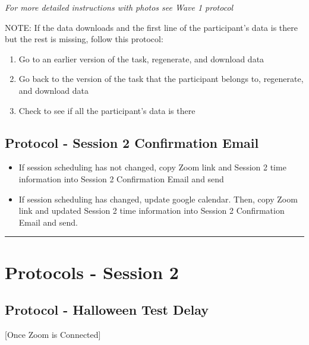 \documentclass[]{book}
\begin{document}
\emph{For more detailed instructions with photos see Wave 1 protocol}

NOTE: If the data downloads and the first line of the participant's data is there but the rest is missing, follow this protocol:

\begin{enumerate}
\def\labelenumi{\arabic{enumi}.}
\item
  Go to an earlier version of the task, regenerate, and download data
\item
  Go back to the version of the task that the participant belongs to, regenerate, and download data
\item
  Check to see if all the participant's data is there
\end{enumerate}

\hypertarget{protocol---session-2-confirmation-email-1}{%
\subsection{Protocol - Session 2 Confirmation Email}\label{protocol---session-2-confirmation-email-1}}

\begin{itemize}
\item
  If session scheduling has not changed, copy Zoom link and Session 2 time information into Session 2 Confirmation Email and send
\item
  If session scheduling has changed, update google calendar. Then, copy Zoom link and updated Session 2 time information into Session 2 Confirmation Email and send.
\end{itemize}

\begin{center}\rule{0.5\linewidth}{0.5pt}\end{center}

\hypertarget{protocols---session-2-1}{%
\section{Protocols - Session 2}\label{protocols---session-2-1}}

\hypertarget{protocol---halloween-test-delay-1}{%
\subsection{Protocol - Halloween Test Delay}\label{protocol---halloween-test-delay-1}}

{[}Once Zoom is Connected{]}
\end{document}
